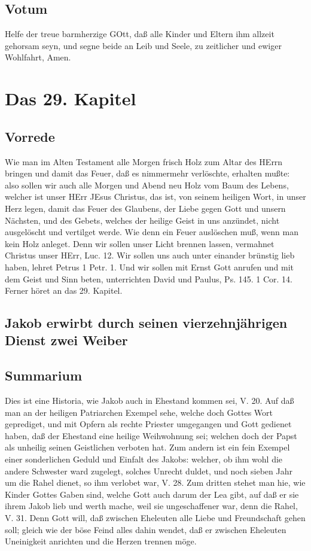 \section{Votum}

Helfe der treue barmherzige GOtt, daß alle Kinder und Eltern ihm allzeit gehorsam seyn, und segne beide an Leib und Seele, zu zeitlicher und ewiger Wohlfahrt, Amen.

\chapter{Das 29. Kapitel}

\section{Vorrede}

Wie man im Alten Testament alle Morgen frisch Holz zum Altar des HErrn bringen und damit das Feuer, daß es nimmermehr verlöschte, erhalten mußte: also sollen wir auch alle Morgen und Abend neu Holz vom Baum des Lebens, welcher ist unser HErr JEsus Christus, das ist, von seinem heiligen Wort, in unser Herz legen, damit das Feuer des Glaubens, der Liebe gegen Gott und unsern Nächsten, und des Gebets, welches der heilige Geist in uns anzündet, nicht ausgelöscht und vertilget werde. Wie denn ein Feuer auslöschen muß, wenn man kein Holz anleget. Denn wir sollen unser Licht brennen lassen, vermahnet Christus unser HErr, Luc. 12. Wir sollen uns auch unter einander brünstig lieb haben, lehret Petrus 1 Petr. 1. Und wir sollen mit Ernst Gott anrufen und mit dem Geist und Sinn beten, unterrichten David und Paulus, Ps. 145. 1 Cor. 14. Ferner höret an das 29. Kapitel.

\section{Jakob erwirbt durch seinen vierzehnjährigen Dienst zwei Weiber}

\section{Summarium}

Dies ist eine Historia, wie Jakob auch in Ehestand kommen sei, V. 20. Auf daß man an der heiligen Patriarchen Exempel sehe, welche doch Gottes Wort geprediget, und mit Opfern als rechte Priester umgegangen und Gott gedienet haben, daß der Ehestand eine heilige Weihwohnung sei; welchen doch der Papst als unheilig seinen Geistlichen verboten hat. Zum andern ist ein fein Exempel einer sonderlichen Geduld und Einfalt des Jakobs: welcher, ob ihm wohl die andere Schwester ward zugelegt, solches Unrecht duldet, und noch sieben Jahr um die Rahel dienet, so ihm verlobet war, V. 28. Zum dritten stehet man hie, wie Kinder Gottes Gaben sind, welche Gott auch darum der Lea gibt, auf daß er sie ihrem Jakob lieb und werth mache, weil sie ungeschaffener war, denn die Rahel, V. 31. Denn Gott will, daß zwischen Eheleuten alle Liebe und Freundschaft gehen soll; gleich wie der böse Feind alles dahin wendet, daß er zwischen Eheleuten Uneinigkeit anrichten und die Herzen trennen möge.

